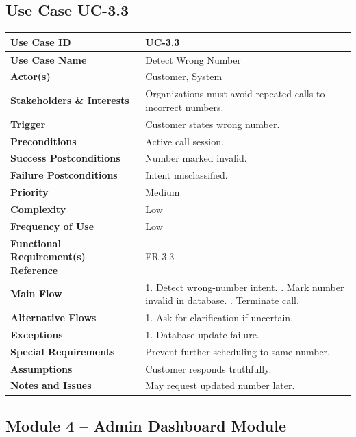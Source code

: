 \documentclass[12pt,a4paper]{report}
\begin{document}
\subsection*{Use Case UC-3.3}
\begin{longtable}{|p{4cm}|p{9cm}|}
\hline
\textbf{Use Case ID} & UC-3.3 \\ \hline
\textbf{Use Case Name} & Detect Wrong Number \\ \hline
\textbf{Actor(s)} & Customer, System \\ \hline
\textbf{Stakeholders \& Interests} & Organizations must avoid repeated calls to incorrect numbers. \\ \hline
\textbf{Trigger} & Customer states wrong number. \\ \hline
\textbf{Preconditions} & Active call session. \\ \hline
\textbf{Success Postconditions} & Number marked invalid. \\ \hline
\textbf{Failure Postconditions} & Intent misclassified. \\ \hline
\textbf{Priority} & Medium \\ \hline
\textbf{Complexity} & Low \\ \hline
\textbf{Frequency of Use} & Low \\ \hline
\textbf{Functional Requirement(s) Reference} & FR-3.3 \\ \hline
\textbf{Main Flow} &
1. Detect wrong-number intent. \newline
2. Mark number invalid in database. \newline
3. Terminate call. \\ \hline
\textbf{Alternative Flows} &
1. Ask for clarification if uncertain. \\ \hline
\textbf{Exceptions} &
1. Database update failure. \\ \hline
\textbf{Special Requirements} &
Prevent further scheduling to same number. \\ \hline
\textbf{Assumptions} &
Customer responds truthfully. \\ \hline
\textbf{Notes and Issues} &
May request updated number later. \\ \hline
\end{longtable}

\subsection{Module 4 – Admin Dashboard Module}
\end{document}
